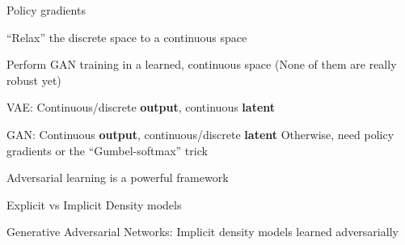 \documentclass{beamer}
\let\tempone\itemize
\let\temptwo\enditemize
\renewenvironment{itemize}{\tempone\addtolength{\itemsep}{0.5\baselineskip}}{\temptwo}
\begin{document}
\begin{frame}
\begin{center}
\end{center}
\begin{itemize}
\item Policy gradients \pause
\item ``Relax'' the discrete space to a continuous space \pause
\item Perform GAN training in a learned, continuous space  \pause
\end{itemize}
(None of them are really robust yet)
\end{frame}

\begin{frame}
\begin{center}
\end{center}
\begin{itemize} 
\item VAE: Continuous/discrete \textbf{output},  continuous \textbf{latent} 
\item GAN: Continuous \textbf{output}, continuous/discrete \textbf{latent}
\end{itemize}
Otherwise, need policy gradients or the ``Gumbel-softmax'' trick
\end{frame}

\begin{frame}
\begin{center}
\end{center}
\begin{itemize} 
\item Adversarial learning is a powerful framework
\item Explicit vs Implicit Density models
\item Generative Adversarial Networks: Implicit density models learned adversarially
\end{itemize}
\end{frame}
\end{document}
